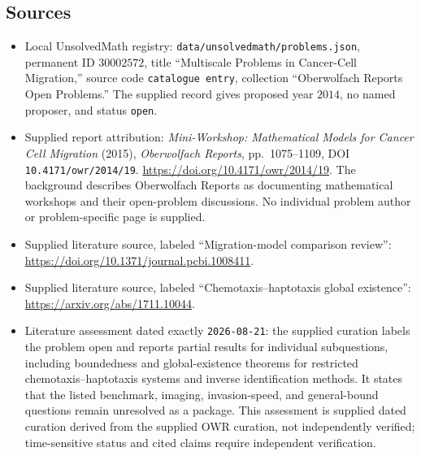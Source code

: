 \documentclass[11pt]{article}
\begin{document}
\subsection{Sources}
\begin{itemize}
\item Local UnsolvedMath registry: \texttt{data/unsolvedmath/problems.json}, permanent ID \(30002572\), title ``Multiscale Problems in Cancer-Cell Migration,'' source code \texttt{catalogue entry}, collection ``Oberwolfach Reports Open Problems.'' The supplied record gives proposed year \(2014\), no named proposer, and status \texttt{open}.
\item Supplied report attribution: \emph{Mini-Workshop: Mathematical Models for Cancer Cell Migration} (2015), \emph{Oberwolfach Reports}, pp.\ 1075--1109, DOI \texttt{10.4171/owr/2014/19}. \url{https://doi.org/10.4171/owr/2014/19}. The background describes Oberwolfach Reports as documenting mathematical workshops and their open-problem discussions. No individual problem author or problem-specific page is supplied.
\item Supplied literature source, labeled ``Migration-model comparison review'': \url{https://doi.org/10.1371/journal.pcbi.1008411}.
\item Supplied literature source, labeled ``Chemotaxis--haptotaxis global existence'': \url{https://arxiv.org/abs/1711.10044}.
\item Literature assessment dated exactly \texttt{2026-08-21}: the supplied curation labels the problem open and reports partial results for individual subquestions, including boundedness and global-existence theorems for restricted chemotaxis--haptotaxis systems and inverse identification methods. It states that the listed benchmark, imaging, invasion-speed, and general-bound questions remain unresolved as a package. This assessment is supplied dated curation derived from the supplied OWR curation, not independently verified; time-sensitive status and cited claims require independent verification.
\end{itemize}
\end{document}
